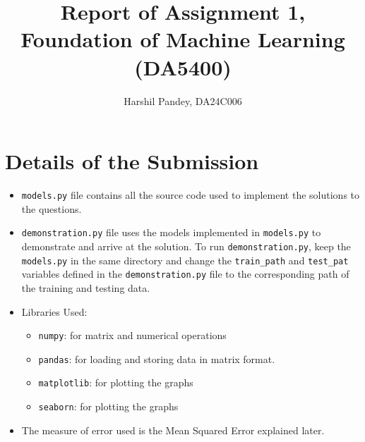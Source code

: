 \documentclass[a4paper]{article}
\title{Report of Assignment 1, Foundation of Machine Learning (DA5400)}
\author{Harshil Pandey, DA24C006}
\begin{document}
\maketitle

\section{Details of the Submission}
\begin{itemize}
    \item \verb|models.py| file contains all the source code used to implement the solutions to the questions.
    
    \item \verb|demonstration.py| file uses the models implemented in \verb|models.py| to demonstrate and arrive at the solution. To run \verb|demonstration.py|, keep the \verb|models.py| in the same directory and change the \verb|train_path| and \verb|test_pat| variables defined in the \verb|demonstration.py| file to the corresponding path of the training and testing data.

    \item Libraries Used: 
    \begin{itemize}
        \item \verb|numpy|: for matrix and numerical operations

        \item \verb|pandas|: for loading and storing data in matrix format.
    
        \item \verb|matplotlib|: for plotting the graphs
        
        \item \verb|seaborn|: for plotting the graphs
    \end{itemize}

    \item The measure of error used is the Mean Squared Error explained later.    
\end{itemize}
\end{document}
